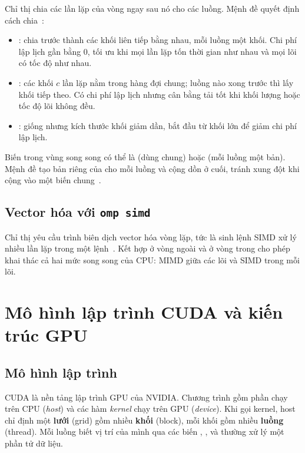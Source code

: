 Chỉ thị  chia các lần lặp của vòng  ngay sau nó cho các luồng. Mệnh đề  quyết định cách chia~\cite{openmp52}:
\begin{itemize}
\item {}: chia trước thành các khối liên tiếp bằng nhau, mỗi luồng một khối. Chi phí lập lịch gần bằng 0, tối ưu khi mọi lần lặp tốn thời gian như nhau và mọi lõi có tốc độ như nhau.
\item {}: các khối $c$ lần lặp nằm trong hàng đợi chung; luồng nào xong trước thì lấy khối tiếp theo. Có chi phí lập lịch nhưng cân bằng tải tốt khi khối lượng hoặc tốc độ lõi không đều.
\item {}: giống  nhưng kích thước khối giảm dần, bắt đầu từ khối lớn để giảm chi phí lập lịch.
\end{itemize}
Biến trong vùng song song có thể là  (dùng chung) hoặc  (mỗi luồng một bản). Mệnh đề  tạo bản riêng của  cho mỗi luồng và cộng dồn ở cuối, tránh xung đột khi cộng vào một biến chung~\cite{openmp52}.

\subsection{Vector hóa với \texttt{omp simd}}

Chỉ thị  yêu cầu trình biên dịch vector hóa vòng lặp, tức là sinh lệnh SIMD xử lý nhiều lần lặp trong một lệnh~\cite{openmp52}. Kết hợp  ở vòng ngoài và  ở vòng trong cho phép khai thác cả hai mức song song của CPU: MIMD giữa các lõi và SIMD trong mỗi lõi.

\section{Mô hình lập trình CUDA và kiến trúc GPU}
\label{sec:cuda}

\subsection{Mô hình lập trình}

CUDA là nền tảng lập trình GPU của NVIDIA. Chương trình gồm phần chạy trên CPU (\emph{host}) và các hàm \emph{kernel} chạy trên GPU (\emph{device}). Khi gọi kernel, host chỉ định một \textbf{lưới} (grid) gồm nhiều \textbf{khối} (block), mỗi khối gồm nhiều \textbf{luồng} (thread). Mỗi luồng biết vị trí của mình qua các biến , ,  và thường xử lý một phần tử dữ liệu.

